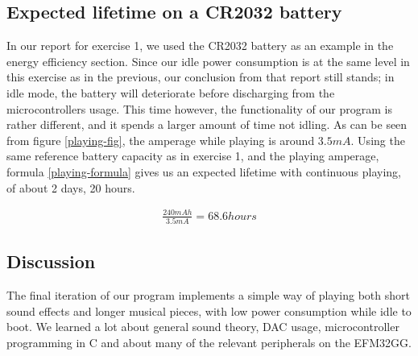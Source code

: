 \subsection{Expected lifetime on a CR2032 battery}

In our report for exercise 1, we used the CR2032 battery as an example in the energy efficiency section. \cite[p.~13]{exercise1report} Since our idle power consumption is at the same level in this exercise as in the previous, our conclusion from that report still stands; in idle mode, the battery will deteriorate before discharging from the microcontrollers usage. This time however, the functionality of our program is rather different, and it spends a larger amount of time not idling. As can be seen from figure \ref{playing-fig}, the amperage while playing is around $3.5mA$. Using the same reference battery capacity \cite{cr2032} as in exercise 1, and the playing amperage, formula \ref{playing-formula} gives us an expected lifetime with continuous playing, of about 2 days, 20 hours.

\begin{gather}
\label{playing-formula}
\frac{240mAh}{3.5mA} = 68.6 hours
\end{gather}

\subsection{Discussion}

The final iteration of our program implements a simple way of playing both short sound effects and longer musical pieces, with low power consumption while idle to boot. We learned a lot about general sound theory, DAC usage, microcontroller programming in C and about many of the relevant peripherals on the EFM32GG. 
